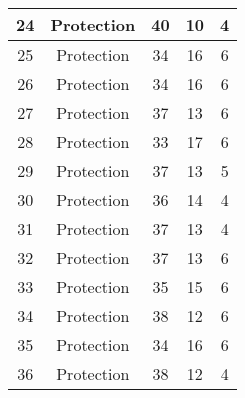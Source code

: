 \documentclass[results.tex]{subfiles}
\begin{document}
\begin{center}
\begin{tabular}{| c || c | c | c | c |}
            \hline
            24                      & Protection                   & 40                     & 10                      & 4                    \\
            \hline
            25                      & Protection                   & 34                     & 16                      & 6                    \\
            \hline
            26                      & Protection                   & 34                     & 16                      & 6                    \\
            \hline
            27                      & Protection                   & 37                     & 13                      & 6                    \\
            \hline
            28                      & Protection                   & 33                     & 17                      & 6                    \\
            \hline
            29                      & Protection                   & 37                     & 13                      & 5                    \\
            \hline
            30                      & Protection                   & 36                     & 14                      & 4                    \\
            \hline
            31                      & Protection                   & 37                     & 13                      & 4                    \\
            \hline
            32                      & Protection                   & 37                     & 13                      & 6                    \\
            \hline
            33                      & Protection                   & 35                     & 15                      & 6                    \\
            \hline
            34                      & Protection                   & 38                     & 12                      & 6                    \\
            \hline
            35                      & Protection                   & 34                     & 16                      & 6                    \\
            \hline
            36                      & Protection                   & 38                     & 12                      & 4                    \\

\end{tabular}
\end{center}
\end{document}
